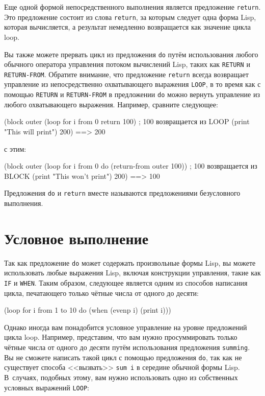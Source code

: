 Еще одной формой непосредственного выполнения является предложение \lstinline{return}. Это
предложение состоит из слова \lstinline{return}, за которым следует одна форма Lisp, которая
вычисляется, а результат немедленно возвращается как значение цикла loop.

Вы также можете прервать цикл из предложения \lstinline{do} путём использования любого обычного
оператора управления потоком вычислений Lisp, таких как \lstinline{RETURN} и
\lstinline{RETURN-FROM}. Обратите внимание, что предложение \lstinline{return} всегда возвращает
управление из непосредственно охватывающего выражения \lstinline{LOOP}, в то время как с
помощью \lstinline{RETURN} и \lstinline{RETURN-FROM} в предложении \lstinline{do} можно вернуть
управление из любого охватывающего выражения. Например, сравните следующее:

\begin{myverb}
(block outer
  (loop for i from 0 return 100) ; 100 возвращается из LOOP
  (print "This will print")
  200) ==> 200
\end{myverb}

\noindent{}с этим:

\begin{myverb}
(block outer
  (loop for i from 0 do (return-from outer 100)) ; 100 возвращается из BLOCK
  (print "This won't print")
  200) ==> 100
\end{myverb}

Предложения \lstinline{do} и \lstinline{return} вместе называются предложениями безусловного
выполнения.

\section{Условное выполнение}

Так как предложение \lstinline{do} может содержать произвольные формы Lisp, вы можете
использовать любые выражения Lisp, включая конструкции управления, такие как \lstinline{IF} и
\lstinline{WHEN}. Таким образом, следующее является одним из способов написания цикла,
печатающего только чётные числа от одного до десяти:

\begin{myverb}
(loop for i from 1 to 10 do (when (evenp i) (print i)))
\end{myverb}

Однако иногда вам понадобится условное управление на уровне предложений цикла
loop. Например, представим, что вам нужно просуммировать только чётные числа от одного до
десяти путём использования предложения \lstinline{summing}. Вы не сможете написать такой цикл с
помощью предложения \lstinline{do}, так как не существует способа <<вызвать>> \lstinline{sum i} в
середине обычной формы Lisp. В~случаях, подобных этому, вам нужно использовать одно из
собственных условных выражений \lstinline{LOOP}:

